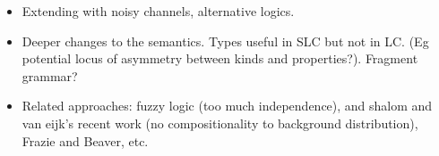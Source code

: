 \documentclass[pdfextras]{handbook}
\begin{document}

\begin{itemize}
\item Extending with noisy channels, alternative logics.
\item Deeper changes to the semantics. Types useful in SLC but not in LC. (Eg potential locus of asymmetry between kinds and properties?). Fragment grammar?
\item Related approaches: fuzzy logic (too much independence), and shalom and van eijk's recent work (no compositionality to background distribution), Frazie and Beaver, etc.
\end{itemize}









%
\end{document}
